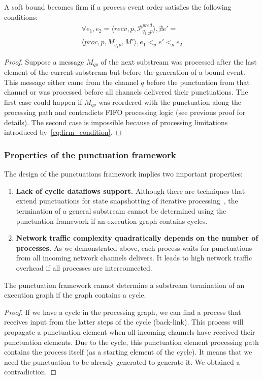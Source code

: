 \begin{lemma}
A soft bound becomes firm if a process event order satisfies the following conditions:
\begin{multline}
\label{eq:firm_condition}
\forall e_1, e_2 = \langle recv, p, \mathcal{P}^{pred}_{q_{1,2}p} \rangle, \nexists e' = \\ \langle proc, p, M_{q_1p}, M' \rangle, e_1 <_p e' <_p e_2
\end{multline}
\end{lemma}
\begin{proof}
Suppose a message $M_{qp}$ of the next substream was processed after the last element of the current substream but before the generation of a bound event. This message either came from the channel $q$ before the punctuation from that channel or was processed before all channels delivered their punctuations. The first case could happen if $M_{qp}$ was reordered with the punctuation along the processing path and contradicts FIFO processing logic (see previous proof for details). The second case is impossible because of processing limitations introduced by~\ref{eq:firm_condition}.
\end{proof}

\subsubsection{Properties of the punctuation framework}

The design of the punctuations framework implies two important properties:

\begin{enumerate}
    \item {\bf Lack of cyclic dataflows support.} Although there are techniques that extend punctuations for state snapshotting of iterative processing~\cite{Carbone:2017:SMA:3137765.3137777}, the termination of a general substream cannot be determined using the punctuation framework if an execution graph contains cycles.
    \item {\bf Network traffic complexity quadratically depends on the number of processes.} As we demonstrated above, each process waits for punctuations from all incoming network channels delivers. It leads to high network traffic overhead if all processes are interconnected.
\end{enumerate}

\begin{lemma}
The punctuation framework cannot determine a substream termination of an execution graph if the graph contains a cycle.
\end{lemma}
\begin{proof}
If we have a cycle in the processing graph, we can find a process that receives input from the latter steps of the cycle (back-link). This process will propagate a punctuation element when all incoming channels have received their punctuation elements. Due to the cycle, this punctuation element processing path contains the process itself (as a starting element of the cycle). It means that we need the punctuation to be already generated to generate it. We obtained a contradiction.
\end{proof}

